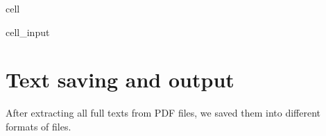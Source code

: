 \documentclass[letterpaper,10pt,english]{jupyterBook}
\begin{document}
\begin{sphinxuseclass}{cell}\begin{sphinxVerbatimInput}

\begin{sphinxuseclass}{cell_input}
\begin{sphinxVerbatim}[commandchars=\\\{\}]
  \PYG{p}{[}\PYG{p}{]}
  \PYG{p}{[}\PYG{p}{]}

  
   

   
       
           
              
              
\end{sphinxVerbatim}

\end{sphinxuseclass}\end{sphinxVerbatimInput}

\end{sphinxuseclass}

\section{Text saving and output}
\label{\detokenize{ch15:text-saving-and-output}}
\sphinxAtStartPar
After extracting all full texts from PDF files, we saved them into different formats of files.
\end{document}
